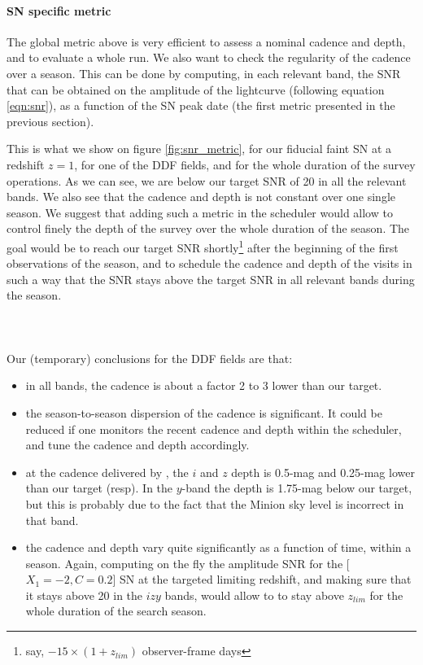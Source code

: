 \documentclass[\docopts]{\docclass}
\begin{document}
\paragraph{SN specific metric} The global metric above is very
efficient to assess a nominal cadence and depth, and to evaluate a
whole  run. We also want to check the regularity of the cadence
over a season. This can be done by computing, in each relevant band,
the SNR that can be obtained on the amplitude of the lightcurve
(following equation \ref{eqn:snr}), as a function of the SN peak date (the first metric presented in the previous section).

This is what we show  on figure \ref{fig:snr_metric}, for our fiducial
faint SN at a  redshift $z=1$, for one of the DDF  fields, and for the
whole duration of  the survey operations. As we can  see, we are below
our target SNR of  20 in all the relevant bands. We  also see that the
cadence and depth  is not constant over one single  season. We suggest
that adding  such a  metric in  the scheduler  would allow  to control
finely the depth of the survey  over the whole duration of the season.
The goal would  be to reach our target  SNR shortly\footnote{say, $-15
  \times (1  + z_{lim})$ observer-frame  days} after the  beginning of
the first observations of the season,  and to schedule the cadence and
depth of the visits in such a  way that the SNR stays above the target
SNR in all relevant bands during the season.




\paragraph{~} Our (temporary) conclusions for the DDF fields are that:
\begin{itemize}
\item in all bands, the cadence is about a factor 2 to 3 lower than our target. 
\item the season-to-season dispersion of the cadence is
  significant. It could be reduced if one monitors the recent cadence
  and depth within the scheduler, and tune the cadence and depth
  accordingly.
\item at the cadence delivered by , the $i$ and $z$ depth
  is 0.5-mag and 0.25-mag lower than our target (resp). In the
  $y$-band the depth is 1.75-mag below our target, but this is
  probably due to the fact that the Minion sky level is incorrect in that band.
\item the cadence and depth vary quite significantly as a function of
  time, within a season. Again, computing on the fly the amplitude SNR
  for the [$X_1=-2, C=0.2$] SN at the targeted limiting redshift, and
  making sure that it stays above 20 in the $izy$ bands, would allow
  to to stay above $z_{lim}$ for the whole duration of the search
  season.
\end{itemize}
\end{document}
